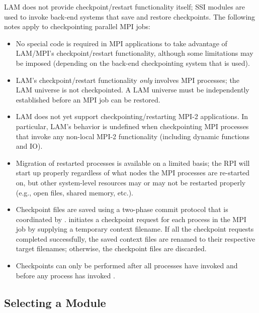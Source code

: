 LAM does not provide checkpoint/restart functionality itself;
 SSI modules are used to invoke back-end systems that save
and restore checkpoints.  The following notes apply to checkpointing
parallel MPI jobs:

\begin{itemize}
\item No special code is required in MPI applications to take
  advantage of LAM/MPI's checkpoint/restart functionality, although
  some limitations may be imposed (depending on the back-end
  checkpointing system that is used).  
  
\item LAM's checkpoint/restart functionality {\em only} involves MPI
  processes; the LAM universe is not checkpointed.  A LAM universe
  must be independently established before an MPI job can be restored.

\item LAM does not yet support checkpointing/restarting MPI-2
  applications.  In particular, LAM's behavior is undefined when
  checkpointing MPI processes that invoke any non-local MPI-2
  functionality (including dynamic functions and IO).  
  
\item Migration of restarted processes is available on a limited
  basis; the  RPI will start up properly regardless of what
  nodes the MPI processes are re-started on, but other system-level
  resources may or may not be restarted properly (e.g., open files,
  shared memory, etc.).

\item Checkpoint files are saved using a two-phase commit protocol that is
  coordinated by .   initiates a checkpoint request
  for each process in the MPI job by supplying a temporary context filename.
  If all the checkpoint requests completed successfully, the saved context
  files are renamed to their respective target filenames; otherwise, the
  checkpoint files are discarded.

\item Checkpoints can only be performed after all processes have
  invoked  and before any process has invoked
  .
\end{itemize}


\subsection{Selecting a  Module}

